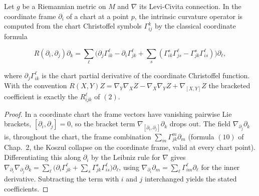 \begin{lemma}
  \label{lem:dc-ch8-3-chart-curvature}


  Let $g$ be a Riemannian metric on $M$ and $\nabla$ its Levi-Civita connection.
  In the coordinate frame $\partial_i$ of a chart at a point $p$, the intrinsic
  curvature operator is computed from the chart Christoffel symbols
  $\Gamma^k_{ij}$ by the classical coordinate formula

  $$
  R(\partial_i,\partial_j)\partial_k
    = \sum_\ell\Big(\partial_j\Gamma^\ell_{ik}-\partial_i\Gamma^\ell_{jk}
      +\sum_s(\Gamma^s_{ik}\Gamma^\ell_{js}-\Gamma^s_{jk}\Gamma^\ell_{is})\Big)\partial_\ell,
  $$

  where $\partial_j\Gamma^\ell_{ik}$ is the chart partial derivative of the
  coordinate Christoffel function. With the convention
  $R(X,Y)Z=\nabla_Y\nabla_X Z-\nabla_X\nabla_Y Z+\nabla_{[X,Y]}Z$ the bracketed
  coefficient is exactly the $R^\ell_{ijk}$ of $(2)$.
\end{lemma}
\begin{proof}

\sketch
  In a coordinate chart the frame vectors have vanishing pairwise Lie brackets,
  $[\partial_i,\partial_j]=0$, so the bracket term
  $\nabla_{[\partial_i,\partial_j]}\partial_k$ drops out. The field
  $\nabla_{\partial_j}\partial_k$ is, throughout the chart, the frame combination
  $\sum_m\Gamma^m_{jk}\partial_m$ (formula $(10)$ of Chap.~2, the Koszul collapse
  on the coordinate frame, valid at every chart point). Differentiating this
  along $\partial_i$ by the Leibniz rule for $\nabla$ gives
  $\nabla_{\partial_i}\nabla_{\partial_j}\partial_k
   =\sum_\ell\big(\partial_i\Gamma^\ell_{jk}
   +\sum_s\Gamma^s_{jk}\Gamma^\ell_{is}\big)\partial_\ell$, using
  $\nabla_{\partial_i}\partial_m=\sum_\ell\Gamma^\ell_{im}\partial_\ell$ for the
  inner derivative. Subtracting the term with $i$ and $j$ interchanged yields the
  stated coefficients.
\end{proof}

